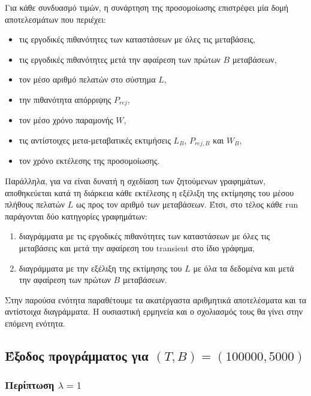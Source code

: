 \documentclass{article}
\begin{document}
Για κάθε συνδυασμό τιμών, η συνάρτηση της προσομοίωσης επιστρέφει μία δομή αποτελεσμάτων που περιέχει:
\begin{itemize}
    \item τις εργοδικές πιθανότητες των καταστάσεων με όλες τις μεταβάσεις,
    \item τις εργοδικές πιθανότητες μετά την αφαίρεση των πρώτων $B$ μεταβάσεων,
    \item τον μέσο αριθμό πελατών στο σύστημα $L$,
    \item την πιθανότητα απόρριψης $P_{rej}$,
    \item τον μέσο χρόνο παραμονής $W$,
    \item τις αντίστοιχες μετα-μεταβατικές εκτιμήσεις $L_B$, $P_{rej,B}$ και $W_B$,
    \item τον χρόνο εκτέλεσης της προσομοίωσης.
\end{itemize}

Παράλληλα, για να είναι δυνατή η σχεδίαση των ζητούμενων γραφημάτων, αποθηκεύεται κατά τη διάρκεια κάθε εκτέλεσης η εξέλιξη της εκτίμησης του μέσου πλήθους πελατών $L$ ως προς τον αριθμό των μεταβάσεων. Έτσι, στο τέλος κάθε \foreignlanguage{english}{run} παράγονται δύο κατηγορίες γραφημάτων:
\begin{enumerate}[label=\arabic*.]
    \item διαγράμματα με τις εργοδικές πιθανότητες των καταστάσεων με όλες τις μεταβάσεις και μετά την αφαίρεση του transient στο ίδιο γράφημα,
    \item διαγράμματα με την εξέλιξη της εκτίμησης του $L$ με όλα τα δεδομένα και μετά την αφαίρεση των πρώτων $B$ μεταβάσεων.
\end{enumerate}

Στην παρούσα ενότητα παραθέτουμε τα ακατέργαστα αριθμητικά αποτελέσματα και τα αντίστοιχα διαγράμματα. Η ουσιαστική ερμηνεία και ο σχολιασμός τους θα γίνει στην επόμενη ενότητα.

\subsection{Έξοδος προγράμματος για $(T,B) = (100000,5000)$}

\subsubsection*{Περίπτωση $\lambda = 1$}
\end{document}
